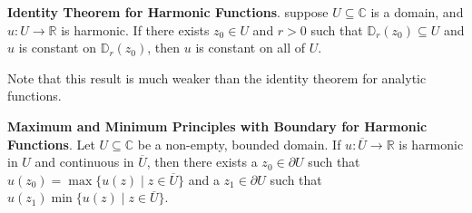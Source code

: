 \textbf{Identity Theorem for Harmonic Functions}. suppose $U\subseteq\mathbb{C}$ is a domain, and $u:U\to\mathbb{R}$ is harmonic. If there exists $z_0\in U$ and $r>0$ such that $\mathbb{D}_r(z_0)\subseteq U$ and $u$ is constant on $\mathbb{D}_r(z_0)$, then $u$ is constant on all of $U$.

Note that this result is much weaker than the identity theorem for analytic functions.

\textbf{Maximum and Minimum Principles with Boundary for Harmonic Functions}. Let $U\subseteq\mathbb{C}$ be a non-empty, bounded domain. If $u:\overline{U}\to\mathbb{R}$ is harmonic in $U$ and continuous in $\overline{U}$, then there exists a $z_0\in\partial U$ such that $u(z_0)=\max \{u(z)\mid z\in \overline{U}\}$ and a $z_1\in\partial U$ such that $u(z_1)\min\{u(z)\mid z\in\overline{U}\}$.

